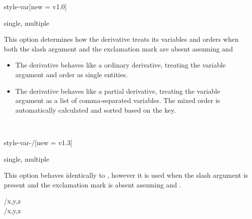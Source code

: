 \clearpage

\begin{option}{style-var}[new = v1.0]
	\begin{values}[default = single]
		single, multiple
	\end{values}
	This option determines how the derivative treats its variables and orders when both the slash argument and the exclamation mark are absent assuming  and 
	\begin{itemize}[widest = {}, leftmargin =*]
		\item[\val{single}] The derivative behaves like a ordinary derivative, treating the variable argument and order as single entities.
		\item[\val{multiple}] The derivative behaves like a partial derivative, treating the variable argument as a list of comma-separated variables. The mixed order is automatically calculated and sorted based on the  key.
	\end{itemize}
	\begin{example}
		 \\
	\end{example}
\end{option}

\begin{option}{style-var-/}[new = v1.3]
	\begin{values}[default = single]
		single, multiple
	\end{values}
	This option behaves identically to , however it is used when the slash argument is present and the exclamation mark is absent assuming  and \keyval{switch-!}{false}.
	\begin{example}
		/{x,y,z} \\
		/{x,y,z}
	\end{example}
\end{option}

